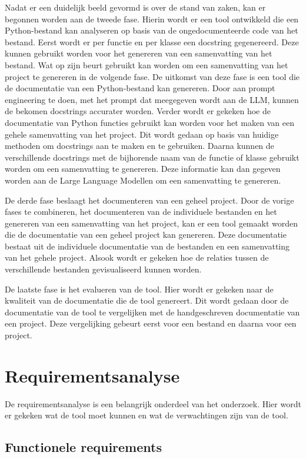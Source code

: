 Nadat er een duidelijk beeld gevormd is over de stand van zaken, kan er begonnen worden aan de tweede fase.
Hierin wordt er een tool ontwikkeld die een Python-bestand kan analyseren op basis van de ongedocumenteerde code van het bestand.
Eerst wordt er per functie en per klasse een docstring gegenereerd. Deze kunnen gebruikt worden voor het genereren van een samenvatting van het bestand. 
Wat op zijn beurt gebruikt kan worden om een samenvatting van het project te genereren in de volgende fase.
De uitkomst van deze fase is een tool die de documentatie van een Python-bestand kan genereren. 
Door aan prompt engineering te doen, met het prompt dat meegegeven wordt aan de LLM, kunnen de bekomen docstrings accurater worden.
Verder wordt er gekeken hoe de documentatie van Python functies gebruikt kan worden voor het maken van een gehele samenvatting van het project.
Dit wordt gedaan op basis van huidige methoden om docstrings aan te maken en te gebruiken. 
Daarna kunnen de verschillende docstrings met de bijhorende naam van de functie of klasse gebruikt worden om een samenvatting te genereren.
Deze informatie kan dan gegeven worden aan de Large Language Modellen om een samenvatting te genereren.

De derde fase beslaagt het documenteren van een geheel project.
Door de vorige fases te combineren, het documenteren van de individuele bestanden en het genereren van een samenvatting van het project, kan er een tool gemaakt worden die de documentatie van een geheel project kan genereren.
Deze documentatie bestaat uit de individuele documentatie van de bestanden en een samenvatting van het gehele project. 
Alsook wordt er gekeken hoe de relaties tussen de verschillende bestanden gevisualiseerd kunnen worden.

De laatste fase is het evalueren van de tool.
Hier wordt er gekeken naar de kwaliteit van de documentatie die de tool genereert.
Dit wordt gedaan door de documentatie van de tool te vergelijken met de handgeschreven documentatie van een project.
Deze vergelijking gebeurt eerst voor een bestand en daarna voor een project.

\section{Requirementsanalyse}
\label{sec:requirements-analyse}
De requirementsanalyse is een belangrijk onderdeel van het onderzoek. 
Hier wordt er gekeken wat de tool moet kunnen en wat de verwachtingen zijn van de tool.

\subsection{Functionele requirements}
\label{sec:functionele-requirements}

